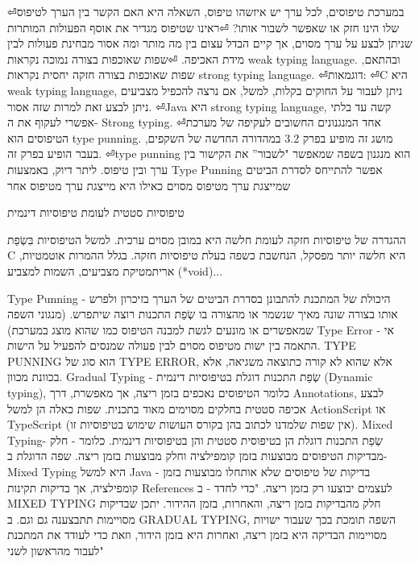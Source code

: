 \begin{טבלא}[!htbp]
⏎במערכת טיפוסים, לכל ערך יש איזשהו טיפוס, השאלה היא האם הקשר בין הערך לטיפוס שלו הינו חזק או שאפשר לשבור אותו?
⏎ראינו שטיפוס מגדיר את אוסף הפעולות המותרות שניתן לבצע על ערך מסוים, אך קיים הבדל עצום בין מה מותר ומה אסור מבחינת פעולות לבין מידת האכיפה.
⏎שפות שאוכפות בצורה נמוכה נקראות weak typing language. ובהתאם, שפות שאוכפות בצורה חזקה יחסית נקראות strong typing language.
⏎דוגמאות:
⏎C היא weak typing language, ניתן לעבור על החוקים בקלות, למשל, אם נרצה להכפיל מצביעים ניתן לבצע זאת למרות שזה אסור.
⏎Java היא strong typing language, קשה עד בלתי אפשרי לעקוף את ה- Strong typing.
⏎אחד המנגנונים החשובים לעקיפה של מערכת הטיפוסים הוא type punning. מושג זה מופיע בפרק 3.2 במהדורה החדשה של השקפים, בעבר הופיע בפרק זה.
⏎type punning הוא מנגנון בשפה שמאפשר "לשבור” את הקישור בין ערך ובין טיפוס. ליתר דיוק, באמצעות Type Punning אפשר להתייחס לסדרת הביטים שמייצגת ערך מטיפוס מסוים כאילו היא מייצגת ערך מטיפוס אחר

      טיפוסיות סטטית לעומת טיפוסיות דינמית

      ההגדרה של טיפוסיות חזקה לעומת חלשה היא במובן מסוים ערכית.
      למשל הטיפוסיות בִּשְׂפַת C היא חלשה יותר מפסקל, הנחשבת כשפה בעלת טיפוסיות חזקה.
      בגלל ההמרות אוטמטיות, אריתמטיקת מצביעים, השמות למצביע (*void)...

      Type Punning - היכולת של המתכנת להתבונן בסדרת הביטים של הערך בזיכרון ולפרש אותו בצורה שונה מאיך שנשמר או מהצורה בו שְׂפַת התכנות רוצה שיתפרש.
      (מנגוני השפה שמאפשרים או מונעים לגשת למבנה הטיפוס כמו שהוא מוצג במערכת)
      Type Error - אי התאמה בין ישות מטיפוס מסוים לבין פעולה שמנסים להפעיל על הישות.
      TYPE PUNNING הוא סוג של TYPE ERROR, אלא שהוא לא קורה כתוצאה משגיאה, אלא בכוונת מכוון.
      Gradual Typing - שְׂפַת התכנות דוגלת בטיפוסיות דינמית (Dynamic typing), כלומר הטיפוסים נאכפים בזמן ריצה, אך מאפשרת, דרך Annotations, לבצע אכיפה סטטית בחלקים מסוימים מאוד בתכנית. שפות כאלה הן למשל ActionScript או TypeScript (אין שפות שלמדנו לכתוב בהן בקורס העושות שימוש בטיפוסיות זו).
      Mixed Typing- שְׂפַת התכנות דוגלת הן בטיפוסית סטטית והן בטיפוסיות דינמית. כלומר - חלק מבדיקות הטיפוסים מבוצעות בזמן קומפילציה וחלק מבוצעות בזמן ריצה. שפה הדוגלת ב-Mixed Typing היא למשל Java - בדיקות של טיפוסים שלא אותחלו מבוצעות בזמן קומפילציה, אך בדיקות תקינות References לעצמים יבוצעו רק בזמן ריצה.
      "כדי לחדד - ב MIXED TYPING חלק מהבדיקות בזמן ריצה, והאחרות, בזמן ההידור. יתכן שבדיקות מסויימות תתבצענה גם וגם.
      ב GRADUAL TYPING, השפה תומכת בכך שעבור ישויות מסויימות הבדיקה היא בזמן ריצה, ואחרות היא בזמן הידור, וזאת כדי לעודד את המתכנת לעבור מהראשון לשני"


\end{טבלא}

